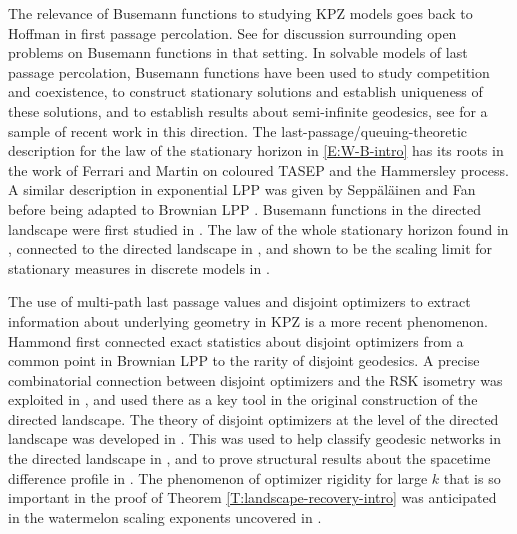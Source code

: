 \documentclass[11pt]{article}
\theoremstyle{definition} %
\theoremstyle{remark} %
\begin{document}
The relevance of Busemann functions to studying KPZ models goes back to Hoffman \cite{hoffman2005coexistence, hoffman2008geodesics} in first passage percolation. See \cite[Section 5]{auffinger201750} for discussion surrounding open problems on Busemann functions in that setting. In solvable models of last passage percolation, Busemann functions have been used to study competition and coexistence, to construct stationary solutions and establish uniqueness of these solutions, and to establish results about semi-infinite geodesics, see \cite{cator2012busemann, cator2013busemann, bakhtin2014space, georgiou2015ratios, georgiou2017geodesics, georgiou2017stationary} for a sample of recent work in this direction. 
The last-passage/queuing-theoretic description for the law of the stationary horizon in \eqref{E:W-B-intro} has its roots in the work of Ferrari and Martin \cite{ferrari2007stationary, ferrari2005multiclass} on coloured TASEP and the Hammersley process. A similar description in exponential LPP was given by Sepp\"al\"ainen and Fan \cite{fan2020joint} before being adapted to Brownian LPP \cite{seppalainen2023busemann}.  Busemann functions in the directed landscape were first studied in \cite{rahman2021infinite}. The law of the whole stationary horizon found in \cite{busani2021diffusive, seppalainen2023global}, connected to the directed landscape in \cite{busani2024stationary}, and shown to be the scaling limit for stationary measures in discrete models in \cite{busani2022scaling, busani2023scaling}. 

The use of multi-path last passage values and disjoint optimizers to extract information about underlying geometry in KPZ is a more recent phenomenon. Hammond \cite{hammond2016brownian, hammond2020exponents} first connected exact statistics about disjoint optimizers from a common point in Brownian LPP to the rarity of disjoint geodesics.  A precise combinatorial connection between disjoint optimizers and the RSK isometry was exploited in \cite{DOV}, and used there as a key tool in the original construction of the directed landscape. The theory of disjoint optimizers at the level of the directed landscape was developed in \cite{dauvergne2021disjoint}. This was used to help classify geodesic networks in the directed landscape in \cite{dauvergne202327}, and to prove structural results about the spacetime difference profile in \cite{ganguly2022fractal}. The phenomenon of optimizer rigidity for large $k$ that is so important in the proof of Theorem \ref{T:landscape-recovery-intro} was anticipated in the watermelon scaling exponents uncovered in \cite{basu2022interlacing}.
\end{document}
